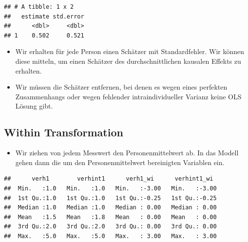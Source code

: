 \documentclass[
]{book}
\newenvironment{Shaded}{\begin{snugshade}}{\end{snugshade}}
\newcommand{\DataTypeTok}[1]{\textcolor[rgb]{0.13,0.29,0.53}{#1}}
\newcommand{\KeywordTok}[1]{\textcolor[rgb]{0.13,0.29,0.53}{\textbf{#1}}}
\newcommand{\NormalTok}[1]{#1}
\newcommand{\OperatorTok}[1]{\textcolor[rgb]{0.81,0.36,0.00}{\textbf{#1}}}
\newcommand{\StringTok}[1]{\textcolor[rgb]{0.31,0.60,0.02}{#1}}
\providecommand{\tightlist}{%
  \setlength{\itemsep}{0pt}\setlength{\parskip}{0pt}}
\begin{document}
\begin{verbatim}
## # A tibble: 1 x 2
##   estimate std.error
##      <dbl>     <dbl>
## 1    0.502     0.521
\end{verbatim}

\begin{itemize}
\tightlist
\item
  Wir erhalten für jede Person einen Schätzer mit Standardfehler. Wir können diese mitteln, um einen Schätzer des durchschnittlichen kausalen Effekts zu erhalten.
\item
  Wir müssen die Schätzer entfernen, bei denen es wegen eines perfekten Zusammenhangs oder wegen fehlender intraindividueller Varianz keine OLS Lösung gibt.
\end{itemize}

\hypertarget{within-transformation}{%
\subsection*{Within Transformation}\label{within-transformation}}

\begin{itemize}
\tightlist
\item
  Wir ziehen von jedem Messwert den Personenmittelwert ab. In das Modell gehen dann die um den Personenmittelwert bereinigten Variablen ein.
\end{itemize}

\begin{Shaded}
\end{Shaded}

\begin{verbatim}
##      verh1        verhint1      verh1_wi      verhint1_wi   
##  Min.   :1.0   Min.   :1.0   Min.   :-3.00   Min.   :-3.00  
##  1st Qu.:1.0   1st Qu.:1.0   1st Qu.:-0.25   1st Qu.:-0.25  
##  Median :1.0   Median :1.0   Median : 0.00   Median : 0.00  
##  Mean   :1.5   Mean   :1.8   Mean   : 0.00   Mean   : 0.00  
##  3rd Qu.:2.0   3rd Qu.:2.0   3rd Qu.: 0.00   3rd Qu.: 0.00  
##  Max.   :5.0   Max.   :5.0   Max.   : 3.00   Max.   : 3.00
\end{verbatim}
\end{document}
